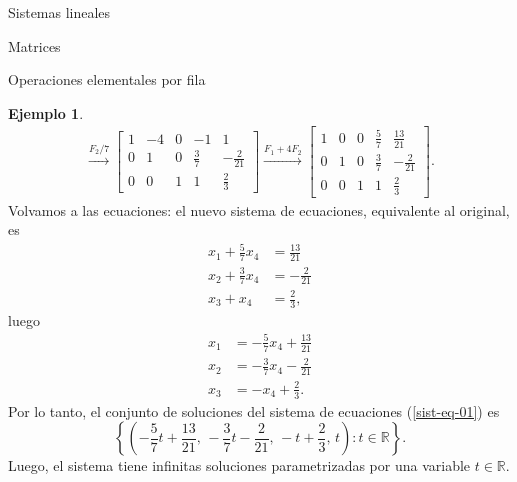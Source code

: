 \documentclass[a4paper,12pt,twoside,spanish,reqno]{amsbook}
\theoremstyle{definition}
\newtheorem{ejemplo}{Ejemplo}[section]
\theoremstyle{remark}
\newcommand{\R}{\mathbb R}
\begin{document}
\begin{chapter}{Sistemas lineales}
\begin{section}{Matrices}
\begin{subsection}{Operaciones elementales por fila}
\begin{ejemplo}
\begin{multline*}
					\stackrel{F_2/7}{\longrightarrow} 
					\left[\begin{array}{cccc|c}  1&-4 &0&-1&1\\ 0& 1&0& \frac37&-\frac{2}{21}\\ 0&0&1&1&\frac{2}{3}\end{array}\right]
					\stackrel{F_1 +4F_2}{\longrightarrow} 
					\left[\begin{array}{cccc|c} 1&0&0&\frac{5}{7}&\frac{13}{21}\\0&1&0&\frac37&-\frac{2}{21} \\ 0&0&1&1&\frac{2}{3}\end{array}\right].
					\end{multline*}
					Volvamos a las ecuaciones: el nuevo sistema de ecuaciones, equivalente al original, es
					\begin{align*}
					x_1 +\frac{5}{7}x_4 &= \frac{13}{21} \\
					x_2 + \frac{3}{7}x_4 &=-\frac{2}{21} \\
					x_3 +x_4 &= \frac{2}{3}, 
					\end{align*}
					luego 
					\begin{align*}
					x_1  &=-\frac{5}{7}x_4 + \frac{13}{21}\\
					x_2  &=- \frac{3}{7}x_4 -\frac{2}{21} \\
					x_3  &= -x_4+\frac{2}{3}. 
					\end{align*}
					Por lo tanto, el conjunto de soluciones del sistema de ecuaciones (\ref{sist-eq-01}) es
					$$
					\left\{(-\frac{5}{7}t+ \frac{13}{21},\,- \frac{3}{7}t-\frac{2}{21},\, -t+\frac{2}{3},\,t): t \in \R \right\}.
					$$
					Luego, el sistema tiene infinitas soluciones parametrizadas por una variable $t \in \R$.
				\end{ejemplo}
				

\end{subsection}
\end{section}
\end{chapter}
\end{document}
